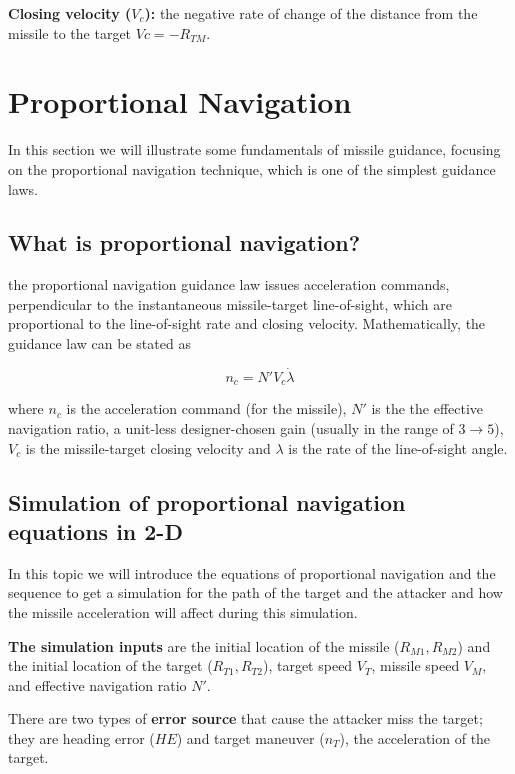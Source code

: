 \textbf{Closing velocity ($V_c$):} the negative rate of change of the distance
from the missile to the target $Vc= -R_{TM} $.




\section{Proportional Navigation}
In this section we will illustrate some fundamentals of missile guidance, focusing on the proportional navigation technique, which is one of the simplest guidance laws.

\subsection*{What is proportional navigation?}
the proportional navigation guidance law issues acceleration commands,
perpendicular to the instantaneous missile-target line-of-sight, which are
proportional to the line-of-sight rate and closing velocity. Mathematically, the
guidance law can be stated as

\begin{equation}
	n_c= N' V_c \dot{\lambda}
\end{equation}

where $n_c$ is the acceleration command (for the missile), $N'$ is the the effective navigation ratio, a unit-less designer-chosen gain (usually in the range of $3 \to 5$), $V_c$ is the missile-target closing velocity and $\lambda$ is the rate of the line-of-sight angle.


\subsection{Simulation of proportional navigation equations in 2-D}
In this topic we will introduce the equations of proportional navigation and the sequence to get a simulation for the path of the target and the attacker and how the missile acceleration will affect during this simulation.

\textbf{The simulation inputs} are the initial location of the missile ($R_{M1}, R_{M2}$) and the initial location of the target ($R_{T1}, R_{T2}$), target speed $V_T$, missile speed $V_M$, and effective navigation ratio $N'$.

There are two types of \textbf{error source} that cause the attacker miss the target; they are heading error ($HE$) and target maneuver ($n_T$), the acceleration of the target.


